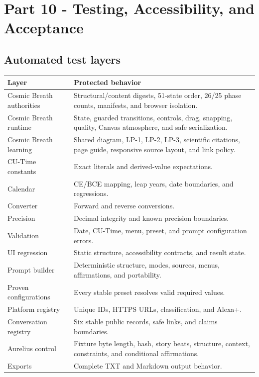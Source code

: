 \documentclass[11pt,letterpaper]{article}
\begin{document}
\section{Part 10 - Testing, Accessibility, and Acceptance}

\subsection{Automated test layers}

\begin{longtable}{L{2.1in}L{4.3in}}
\toprule
\textbf{Layer} & \textbf{Protected behavior} \\
\midrule
Cosmic Breath authorities & Structural/content digests, 51-state order, 26/25 phase counts, manifests, and browser isolation. \\
Cosmic Breath runtime & State, guarded transitions, controls, drag, snapping, quality, Canvas atmosphere, and safe serialization. \\
Cosmic Breath learning & Shared diagram, LP-1, LP-2, LP-3, scientific citations, page guide, responsive source layout, and link policy. \\
CU-Time constants & Exact literals and derived-value expectations. \\
Calendar & CE/BCE mapping, leap years, date boundaries, and regressions. \\
Converter & Forward and reverse conversions. \\
Precision & Decimal integrity and known precision boundaries. \\
Validation & Date, CU-Time, menu, preset, and prompt configuration errors. \\
UI regression & Static structure, accessibility contracts, and result state. \\
Prompt builder & Deterministic structure, modes, sources, menus, affirmations, and portability. \\
Proven configurations & Every stable preset resolves valid required values. \\
Platform registry & Unique IDs, HTTPS URLs, classification, and Alexa+. \\
Conversation registry & Six stable public records, safe links, and claims boundaries. \\
Aurelius control & Fixture byte length, hash, story beats, structure, context, constraints, and conditional affirmations. \\
Exports & Complete TXT and Markdown output behavior. \\
\bottomrule
\end{longtable}
\end{document}
